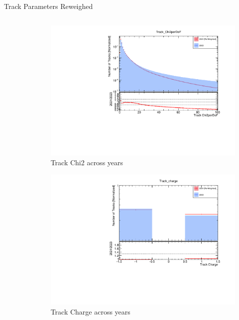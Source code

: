 \begin{frame}{Track Parameters Reweighed}
\begin{columns}
\begin{column}{0.5\linewidth}
\begin{figure}
            \end{figure}
        \end{column}
        \begin{column}{0.5\linewidth}
            \vspace{-0.45cm}
            \begin{figure}
                \includegraphics[width=\linewidth]{./ReweighedPlots/Track_Chi2perDoF_Reweighted.pdf}
                \caption{Track Chi2 across years}
            \end{figure}
            \vspace{-0.9cm}
            \begin{figure}
                \includegraphics[width=\linewidth]{./ReweighedPlots/Track_charge_Reweighted.pdf}
                \caption{Track Charge across years}
            \end{figure}
        \end{column}
    \end{columns}
\end{frame}

